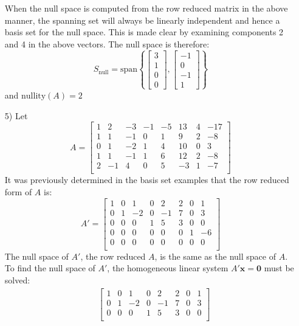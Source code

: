 \documentclass{article}
\begin{document}
\begin{itemize}
When the null space is computed from the row reduced matrix in the above manner, the spanning set will always be linearly independent and hence a basis set for the null space. This is made clear by examining components 2 and 4 in the above vectors. The null space is therefore:
\[S_{\text{null}} = \text{span}\left\{\begin{bmatrix} 3 \\ 1 \\ 0 \\ 0 \end{bmatrix}, \begin{bmatrix} -1 \\ 0 \\ -1 \\ 1 \end{bmatrix}\right\}\]
and \(\text{nullity}(A) = 2\)
\item[5)] Let \[A = \begin{bmatrix}
1 &  2 & -3 & -1 & -5 &  13 & 4 & -17 \\
1 &  1 & -1 &  0 &  1 &    9 &  2 &   -8 \\
0 &  1 & -2 &  1 &  4 &  10 &  0 &    3 \\
1 &  1 & -1 &  1 &  6 &  12 &  2 &   -8 \\ 
2 & -1 &  4 &  0 &  5 &  -3 &  1 &   -7 \\ 
\end{bmatrix}\]
It was previously determined in the basis set examples that the row reduced form of \(A\) is: 
\[A' = \begin{bmatrix}
1 & 0 &  1 & 0 &  2 &  2 & 0 &  1 \\
0 & 1 & -2 & 0 & -1 & 7 & 0 &  3 \\
0 & 0 &  0 & 1 &  5 &  3 & 0 &  0 \\
0 & 0 &  0 & 0 &  0 &  0 & 1 & -6 \\ 
0 & 0 &  0 & 0 &  0 &  0 & 0 &  0 \\
\end{bmatrix}\]
The null space of \(A'\), the row reduced \(A\), is the same as the null space of \(A\). To find the null space of \(A'\), the homogeneous linear system \(A'\mathbf{x} = \mathbf{0}\) must be solved:
\begin{align*}
& \begin{bmatrix}
1 & 0 &  1 & 0 &  2 &  2 & 0 &  1 \\
0 & 1 & -2 & 0 & -1 & 7 & 0 &  3 \\
0 & 0 &  0 & 1 &  5 &  3 & 0 &  0 \\

\end{bmatrix}
\end{align*}
\end{itemize}
\end{document}
